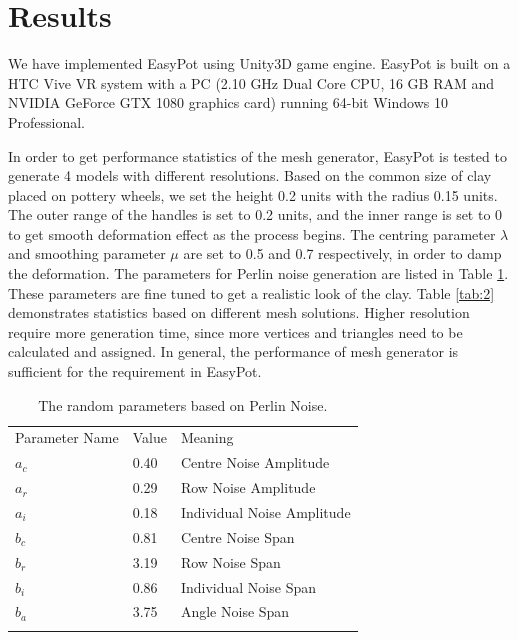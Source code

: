 \documentclass{svjour3}                     %
\begin{document}

\section{Results}
\label{sec:5}

We have implemented EasyPot using Unity3D \cite{website:unity} game engine. EasyPot is built on a HTC Vive VR system with a PC (2.10 GHz Dual Core CPU, 16 GB RAM and NVIDIA GeForce GTX 1080 graphics card) running 64-bit Windows 10 Professional.

In order to get performance statistics of the mesh generator, EasyPot is tested to generate 4 models with different resolutions.
Based on the common size of clay placed on pottery wheels, we set the height 0.2 units with the radius 0.15 units.
The outer range of the handles is set to 0.2 units, and the inner range is set to 0 to get smooth deformation effect as the process begins. The centring parameter $\lambda$ and smoothing parameter $\mu$ are set to 0.5 and 0.7 respectively, in order to damp the deformation. The parameters for Perlin noise generation are listed in Table \ref{tab:1}. These parameters are fine tuned to get a realistic look of the clay.
Table \ref{tab:2} demonstrates statistics based on different mesh solutions. Higher resolution require more generation time, since more vertices and triangles need to be calculated and assigned. In general, the performance of mesh generator is sufficient for the requirement in EasyPot.

\begin{table}
\caption{The random parameters based on Perlin Noise.}
\label{tab:1}       %
\begin{tabular}{lll}
\hline\noalign{\smallskip}
Parameter Name & Value & Meaning  \\
\noalign{\smallskip}\hline\noalign{\smallskip}
$a_{c}$ & 0.40 & Centre Noise Amplitude \\
$a_{r}$ & 0.29 & Row Noise Amplitude \\
$a_{i}$ & 0.18 & Individual Noise Amplitude \\
$b_{c}$ & 0.81 & Centre Noise Span \\
$b_{r}$ & 3.19 & Row Noise Span \\
$b_{i}$ & 0.86 & Individual Noise Span \\
$b_{a}$ & 3.75 & Angle Noise Span \\
\noalign{\smallskip}\hline
\end{tabular}
\end{table}
\end{document}
